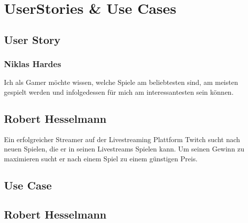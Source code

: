 \section{UserStories \& Use Cases}

\subsection{User Story}

\subsubsection{Niklas Hardes}

Ich als Gamer möchte wissen, welche Spiele am beliebtesten sind, am meisten gespielt werden und infolgedessen für mich am interessantesten sein können.

\subsection{Robert Hesselmann}

Ein erfolgreicher Streamer auf der Livestreaming Plattform Twitch sucht nach neuen Spielen, die er in seinen Livestreams Spielen kann. Um seinen Gewinn zu maximieren sucht er nach einem Spiel zu einem günstigen Preis.

\subsection{Use Case}


\subsection{Robert Hesselmann}

